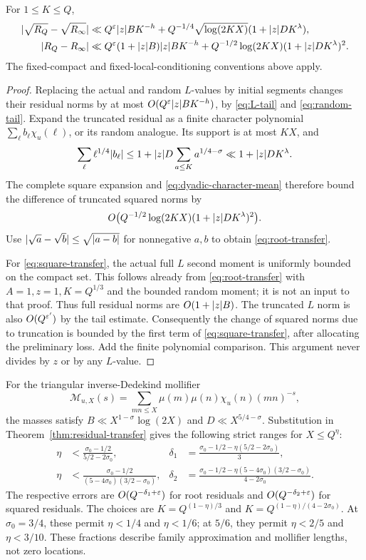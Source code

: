 \begin{theorem}\label{thm:residual-transfer}
For $1\le K\le Q$,
\begin{align}
 \lvert\sqrt{R_Q}-\sqrt{R_\infty}\rvert
 &\ll Q^\varepsilon\lvert z\rvert B K^{-h}
  +Q^{-1/4}\sqrt{\log(2KX)}(1+\lvert z\rvert D K^\lambda),
 \label{eq:root-transfer}\\
 \lvert R_Q-R_\infty\rvert
 &\ll Q^\varepsilon(1+\lvert z\rvert B)\lvert z\rvert B K^{-h}
  +Q^{-1/2}\log(2KX)(1+\lvert z\rvert D K^\lambda)^2.
 \label{eq:square-transfer}
\end{align}
The fixed-compact and fixed-local-conditioning conventions above apply.
\end{theorem}
\begin{proof}
Replacing the actual and random $L$-values by initial segments changes their residual norms by at most $O(Q^\varepsilon\lvert z\rvert B K^{-h})$, by \eqref{eq:L-tail} and \eqref{eq:random-tail}. Expand the truncated residual as a finite character polynomial $\sum_\ell b_\ell\chi_u(\ell)$, or its random analogue. Its support is at most $KX$, and
\[
 \sum_\ell\ell^{1/4}\lvert b_\ell\rvert
 \le1+\lvert z\rvert D\sum_{a\le K}a^{1/4-\sigma}
 \ll1+\lvert z\rvert D K^\lambda.
\]
The complete square expansion and \eqref{eq:dyadic-character-mean} therefore bound the difference of truncated squared norms by
\[
 O\bigl(Q^{-1/2}\log(2KX)(1+\lvert z\rvert D K^\lambda)^2\bigr).
\]
Use $\lvert\sqrt a-\sqrt b\rvert\le\sqrt{\lvert a-b\rvert}$ for nonnegative $a,b$ to obtain \eqref{eq:root-transfer}.

For \eqref{eq:square-transfer}, the actual full $L$ second moment is uniformly bounded on the compact set. This follows already from \eqref{eq:root-transfer} with $A=1,z=1,K=Q^{1/3}$ and the bounded random moment; it is not an input to that proof. Thus full residual norms are $O(1+\lvert z\rvert B)$. The truncated $L$ norm is also $O(Q^{\varepsilon'})$ by the tail estimate. Consequently the change of squared norms due to truncation is bounded by the first term of \eqref{eq:square-transfer}, after allocating the preliminary loss. Add the finite polynomial comparison. This argument never divides by $z$ or by any $L$-value.
\end{proof}

For the triangular inverse-Dedekind mollifier
\[
 \mathcal M_{u,X}(s)=\sum_{mn\le X}\mu(m)\mu(n)\chi_u(n)(mn)^{-s},
\]
the masses satisfy $B\ll X^{1-\sigma}\log(2X)$ and $D\ll X^{5/4-\sigma}$. Substitution in Theorem~\ref{thm:residual-transfer} gives the following strict ranges for $X\le Q^\eta$:
\begin{align}
 \eta&<\frac{\sigma_0-1/2}{5/2-2\sigma_0},&
 \delta_1&=\frac{\sigma_0-1/2-\eta(5/2-2\sigma_0)}3,
 \label{eq:root-range}\\
 \eta&<\frac{\sigma_0-1/2}{(5-4\sigma_0)(3/2-\sigma_0)},&
 \delta_2&=\frac{\sigma_0-1/2-\eta(5-4\sigma_0)(3/2-\sigma_0)}{4-2\sigma_0}.
 \label{eq:square-range}
\end{align}
The respective errors are $O(Q^{-\delta_1+\varepsilon})$ for root residuals and $O(Q^{-\delta_2+\varepsilon})$ for squared residuals. The choices are $K=Q^{(1-\eta)/3}$ and $K=Q^{(1-\eta)/(4-2\sigma_0)}$. At $\sigma_0=3/4$, these permit $\eta<1/4$ and $\eta<1/6$; at $5/6$, they permit $\eta<2/5$ and $\eta<3/10$. These fractions describe family approximation and mollifier lengths, not zero locations.

